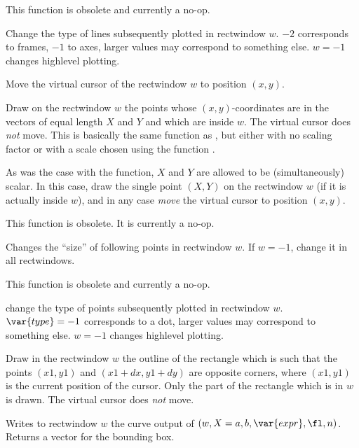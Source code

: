 \label{se:plotlinetype}
This function is obsolete and currently a no-op.

Change the type of lines subsequently plotted in rectwindow $w$.
 $-2$ corresponds to frames, $-1$ to axes, larger values may
correspond to something else. $w = -1$ changes highlevel plotting.

\label{se:plotmove}
Move the virtual cursor of the rectwindow $w$ to position $(x,y)$.

\label{se:plotpoints}
Draw on the rectwindow $w$ the
points whose $(x,y)$-coordinates are in the vectors of equal length $X$ and
$Y$ and which are inside $w$. The virtual cursor does \emph{not} move. This
is basically the same function as , but either with no scaling
factor or with a scale chosen using the function .

As was the case with the  function, $X$ and $Y$ are allowed to
be (simultaneously) scalar. In this case, draw the single point $(X,Y)$ on
the rectwindow $w$ (if it is actually inside $w$), and in any case
\emph{move} the virtual cursor to position $(x,y)$.

\label{se:plotpointsize}
This function is obsolete. It is currently a no-op.

Changes the ``size'' of following points in rectwindow $w$. If $w = -1$,
change it in all rectwindows.

\label{se:plotpointtype}
This function is obsolete and currently a no-op.

change the type of points subsequently plotted in rectwindow $w$.
$\var{type} = -1$ corresponds to a dot, larger values may correspond to
something else. $w = -1$ changes highlevel plotting.

\label{se:plotrbox}
Draw in the rectwindow $w$ the outline of the rectangle which is such
that the points $(x1,y1)$ and $(x1+dx,y1+dy)$ are opposite corners, where
$(x1,y1)$ is the current position of the cursor. Only the part of the
rectangle which is in $w$ is drawn. The virtual cursor does \emph{not} move.

\label{se:plotrecth}
Writes to rectwindow $w$ the curve output of
$(w,X=a,b,\var{expr},\fl,n)$. Returns a vector for the bounding box.

